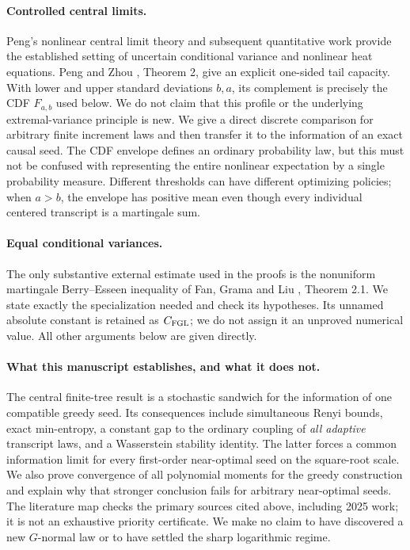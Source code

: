 \documentclass[11pt,a4paper]{article}
\begin{document}
\paragraph{Controlled central limits.}
Peng's nonlinear central limit theory \cite{Peng07} and subsequent
quantitative work \cite{FPSS18} provide the established setting of
uncertain conditional variance and nonlinear heat equations.
Peng and Zhou \cite{PZ19}, Theorem 2, give an explicit one-sided tail
capacity. With lower and upper standard deviations $b,a$, its complement
is precisely the CDF $F_{a,b}$ used below. We do not claim that this
profile or the underlying extremal-variance principle is new.
We give a direct discrete comparison for arbitrary finite increment
laws and then transfer it to the information of an exact causal seed.
The CDF envelope defines an ordinary probability law, but this must not
be confused with representing the entire nonlinear expectation by a
single probability measure. Different thresholds can have different
optimizing policies; when $a>b$, the envelope has positive mean even
though every individual centered transcript is a martingale sum.

\paragraph{Equal conditional variances.}
The only substantive external estimate used in the proofs is the
nonuniform martingale Berry--Esseen inequality of Fan, Grama and Liu
\cite{FGL}, Theorem 2.1. We state exactly the specialization needed and
check its hypotheses. Its unnamed absolute constant is retained as
$C_{\rm FGL}$; we do not assign it an unproved numerical value.
All other arguments below are given directly.

\paragraph{What this manuscript establishes, and what it does not.}
The central finite-tree result is a stochastic sandwich for the information
of one compatible greedy seed. Its consequences include simultaneous
Renyi bounds, exact min-entropy, a constant gap to the ordinary coupling
of \emph{all adaptive} transcript laws, and a Wasserstein stability identity.
The latter forces a common information limit for every first-order
near-optimal seed on the square-root scale. We also prove convergence
of all polynomial moments for the greedy construction and explain why
that stronger conclusion fails for arbitrary near-optimal seeds.
The literature map checks the primary sources cited above, including
2025 work; it is not an exhaustive priority certificate. We make no
claim to have discovered a new $G$-normal law or to have settled the
sharp logarithmic regime.
\end{document}
